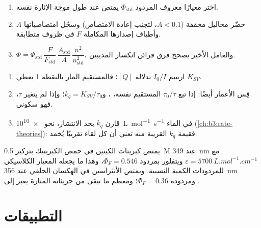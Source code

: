 \begin{method}\label{met:b3:electronic-spectroscopy:relative-yield}
\begin{enumerate}
  \item اختر معيارًا معروف المردود $\Phi_{\mathrm{std}}$ يمتص عند طول موجة
        الإثارة نفسه.
  \item حضّر محاليل مخففة ($A < 0.1$، لتجنب إعادة الامتصاص) وسجّل
        امتصاصياتها $A$ وأطياف إصدارها المكاملة $F$ في ظروف
        متطابقة.
  \item $\Phi = \Phi_{\mathrm{std}}\,\dfrac{F}{F_{\mathrm{std}}}\,\dfrac{A_{\mathrm{std}}}{A}\,
        \dfrac{n^2}{n_{\mathrm{std}}^2}$، والعامل الأخير يصحح فرق
        قرائن انكسار المذيبين.
\end{enumerate}
\end{method}

\begin{method}\label{met:b3:electronic-spectroscopy:stern-volmer}
\begin{enumerate}
  \item ارسم $I_0/I$ بدلالة $[Q]$؛ فالمستقيم المار بالنقطة 1 يعطي $K_{SV}$.
  \item قِس الأعمار أيضًا: إذا تبع $\tau_0/\tau$ المستقيم نفسه، ، و$k_q = K_{SV}/\tau_0$؛ وإذا لم يتغير $\tau$، فهو سكوني.
  \item قارن $k_q$ بحد الانتشار، نحو \qty{e10}{L.mol^{-1}.s^{-1}} في
        الماء (\cref{ch:b3:rate-theories}): فقيمة $k_q$ القريبة منه تعني أن كل
        لقاء تقريبًا يُخمد.
\end{enumerate}
\end{method}

\begin{example}\label{ex:b3:electronic-spectroscopy:quinine}
يمتص كبريتات الكينين في حمض الكبريتيك بتركيز \qty{0.5}{M} عند \qty{349}{nm} مع $\varepsilon =
\qty{5700}{L.mol^{-1}.cm^{-1}}$ ويتفلور بمردود $\Phi_F = 0.546$، وهذا ما يجعله
المعيار الكلاسيكي للمردودات الكمية النسبية. ويمتص الأنثراسين في الهكسان الحلقي
عند \qty{356}{nm} ومردوده $\Phi_F = 0.36$؛ ومعظم ما تبقى من جزيئاته المثارة
يعبر إلى .
\end{example}

\section{التطبيقات}

